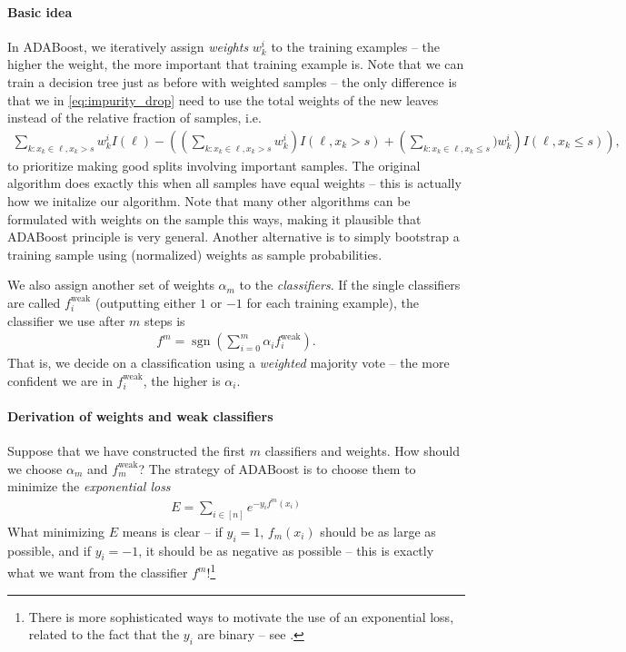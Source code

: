 \documentclass{article}
\DeclareMathOperator{\sgn}{sgn}
\newcommand{\weak}{\mathrm{weak}}
\begin{document}
\paragraph{Basic idea} In ADABoost, we iteratively assign \emph{weights} $w_k^i$ to the training examples -- the higher the weight, the more important that training example is. Note that we can train a decision tree just as before with weighted samples -- the only difference is that we in \eqref{eq:impurity_drop} need to use the total weights of the new leaves instead of the relative fraction of samples, i.e.
\begin{align*}
    \sum_{k: x_k \in \ell, x_k>s}w_k^iI(\ell)  - \left(\left(\sum_{k: x_k \in \ell, x_k>s}w_k^i\right) I(\ell, x_k>s) + \left(\sum_{k: x_k \in \ell, x_k\leq s})w_k^i\right) I(\ell, x_k\leq s)\right),
\end{align*}
to prioritize making good splits involving important samples. The original algorithm does exactly this when all samples have equal weights -- this is actually how we initalize our algorithm. Note that many other algorithms can be formulated with weights on the sample this ways, making it plausible that ADABoost principle is very general. Another alternative is to simply bootstrap a training sample using (normalized) weights as sample probabilities.

We also assign another set of weights $\alpha_m$ to the \emph{classifiers}. If the single classifiers are called $f_i^\weak$ (outputting either $1$ or $-1$ for each training example), the  classifier we use after $m$ steps is
\begin{align*}
    f^m = \sgn\left(\sum_{i=0}^m \alpha_i f_i^\weak\right).
\end{align*}
That is, we decide on a classification using a \emph{weighted} majority vote -- the more confident we are in $f_i^\weak$, the higher is $\alpha_i$.

\paragraph{Derivation of weights and weak classifiers} Suppose that we have constructed the first $m$ classifiers and weights. How should we choose $\alpha_m$ and $f_m^\weak$? The strategy of ADABoost is to choose them to minimize the \emph{exponential loss}
\begin{align} \label{eq:err}
    E = \sum_{i\in[n]} e^{-y_if^m(x_i)}
\end{align}
What minimizing $E$ means is clear -- if $y_i=1$, $f_m(x_i)$ should be as large as possible, and if $y_i=-1$, it should be as negative as possible -- this is exactly what we want from the classifier $f^m$!\footnote{There is  more sophisticated ways to motivate the use of an exponential loss, related to the fact that the $y_i$ are binary  -- see \cite[Chapter 10]{hastie2009elements}.} \newline
\end{document}
